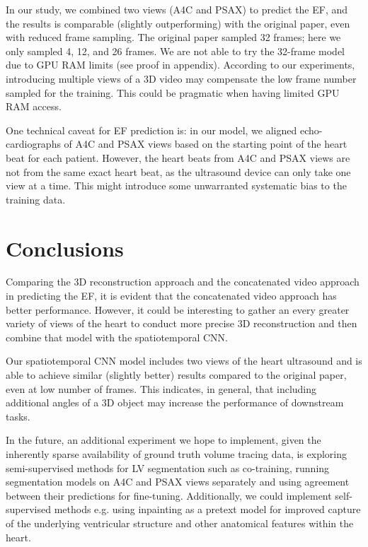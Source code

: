 \documentclass{article}
\begin{document}
In our study, we combined two views (A4C and PSAX) to predict the EF, and the results is comparable (slightly outperforming) with the original paper, even with reduced frame sampling. The original paper sampled 32 frames; here we only sampled 4, 12, and 26 frames. We are not able to try the 32-frame model due to GPU RAM limits (see proof in appendix). According to our experiments, introducing multiple views of a 3D video may compensate the low frame number sampled for the training. This could be pragmatic when having limited GPU RAM access. 

One technical caveat for EF prediction is: in our model, we aligned echo-cardiographs of A4C and PSAX views based on the starting point of the heart beat for each patient. However, the heart beats from A4C and PSAX views are not from the same exact heart beat, as the ultrasound device can only take one view at a time. This might introduce some unwarranted systematic bias to the training data.



\section{Conclusions}\label{sec5}
Comparing the 3D reconstruction approach and the concatenated video approach in predicting the EF, it is evident that the concatenated video approach has better performance. However, it could be interesting to gather an every greater variety of views of the heart to conduct more precise 3D reconstruction and then combine that model with the spatiotemporal CNN.

Our spatiotemporal CNN model includes two views of the heart ultrasound and is able to achieve similar (slightly better) results compared to the original paper, even at low number of frames. This indicates, in general, that including additional angles of a 3D object may increase the performance of downstream tasks.

In the future, an additional experiment we hope to implement,  given the inherently sparse availability of ground truth volume tracing data, is exploring semi-supervised methods for LV segmentation such as co-training, running segmentation models on A4C and PSAX views separately and using agreement between their predictions for fine-tuning. Additionally, we could implement self-supervised methods e.g. using inpainting as a pretext model for improved capture of the underlying ventricular structure and other anatomical features within the heart. 
\end{document}
